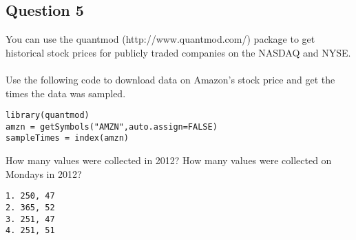 \documentclass[]{article}
\begin{document}
\subsection*{Question 5}
You can use the quantmod (http://www.quantmod.com/) package to get historical stock prices for publicly traded companies on the NASDAQ and NYSE. \\
\\
Use the following code to download data on Amazon's stock price and get the times the data was sampled.
\begin{framed}
\begin{verbatim}
library(quantmod)
amzn = getSymbols("AMZN",auto.assign=FALSE)
sampleTimes = index(amzn) 
\end{verbatim}
\end{framed}
How many values were collected in 2012? How many values were collected on Mondays in 2012?
\begin{verbatim}
1. 250, 47
2. 365, 52
3. 251, 47
4. 251, 51
\end{verbatim}
\end{document}
